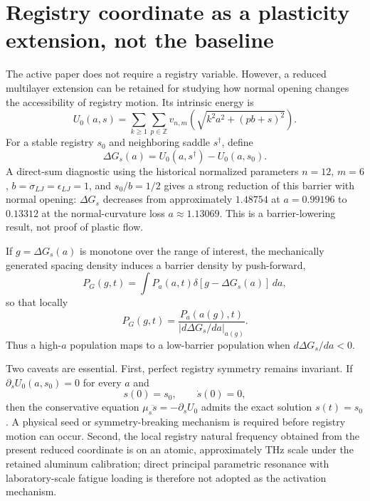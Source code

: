 \documentclass[11pt]{article}
\begin{document}
\section{Registry coordinate as a plasticity extension, not the baseline}
The active paper does not require a registry variable. However, a reduced multilayer extension can be retained for studying how normal opening changes the accessibility of registry motion. Its intrinsic energy is
\begin{equation}
U_0(a,s)
=\sum_{k\ge1}\sum_{p\in\mathbb Z}
 v_{n,m}\!\left(\sqrt{k^2a^2+(pb+s)^2}\right).
\label{eq:u0as}
\end{equation}
For a stable registry \(s_0\) and neighboring saddle \(s^\dagger\), define
\begin{equation}
\Delta G_s(a)=U_0(a,s^\dagger)-U_0(a,s_0).
\label{eq:registrybarrier}
\end{equation}
A direct-sum diagnostic using the historical normalized parameters \(n=12\), \(m=6\), \(b=\sigma_{LJ}=\epsilon_{LJ}=1\), and \(s_0/b=1/2\) gives a strong reduction of this barrier with normal opening: \(\Delta G_s\) decreases from approximately \(1.48754\) at \(a=0.99196\) to \(0.13312\) at the normal-curvature loss \(a\approx1.13069\). This is a barrier-lowering result, not proof of plastic flow.

If \(g=\Delta G_s(a)\) is monotone over the range of interest, the mechanically generated spacing density induces a barrier density by push-forward,
\begin{equation}
P_G(g,t)
=\int P_a(a,t)\delta[g-\Delta G_s(a)]\,da,
\end{equation}
so that locally
\begin{equation}
P_G(g,t)
=\frac{P_a(a(g),t)}{|d\Delta G_s/da|_{a(g)}}.
\end{equation}
Thus a high-\(a\) population maps to a low-barrier population when \(d\Delta G_s/da<0\).

Two caveats are essential. First, perfect registry symmetry remains invariant. If \(\partial_sU_0(a,s_0)=0\) for every \(a\) and
\begin{equation}
s(0)=s_0,\qquad \dot s(0)=0,
\end{equation}
then the conservative equation \(\mu_s\ddot s=-\partial_sU_0\) admits the exact solution \(s(t)=s_0\). A physical seed or symmetry-breaking mechanism is required before registry motion can occur. Second, the local registry natural frequency obtained from the present reduced coordinate is on an atomic, approximately THz scale under the retained aluminum calibration; direct principal parametric resonance with laboratory-scale fatigue loading is therefore not adopted as the activation mechanism.
\end{document}
